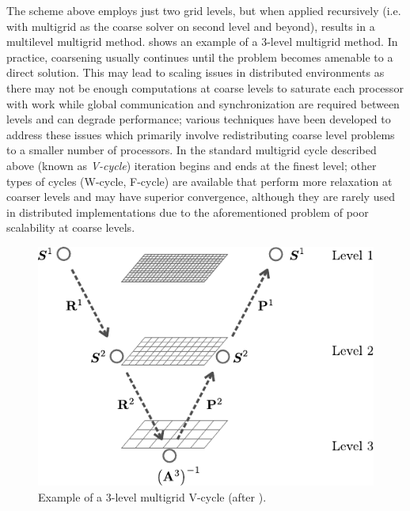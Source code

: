 The scheme above employs just two grid levels, but when applied recursively (i.e. with multigrid as the coarse solver on second level and beyond), results in a multilevel multigrid method.    shows an example of a 3-level multigrid method.   In practice, coarsening usually continues until the problem becomes amenable to a direct solution.   This may lead to scaling issues in distributed environments as there may not be enough computations at coarse levels to saturate each processor with work while global communication and synchronization are required between levels and can degrade performance; various techniques have been developed to address these issues \cite{Chow2006} which primarily involve redistributing coarse level problems to a smaller number of processors.   In the standard multigrid cycle described above (known as \textit{V-cycle}) iteration begins and ends at the finest level; other types of cycles (W-cycle, F-cycle) are available that perform more relaxation at coarser levels and may have superior convergence, although they are rarely used in distributed implementations due to the aforementioned problem of poor scalability at coarse levels.

\begin{figure} [htbp]
  \centerline{\includegraphics[width=0.5\linewidth]{figs/multigrid_schematic}}
  \caption{\label{fig:multigrid_schematic} Example of a 3-level multigrid V-cycle (after \cite{Verdugo2016}).}
\end{figure}

